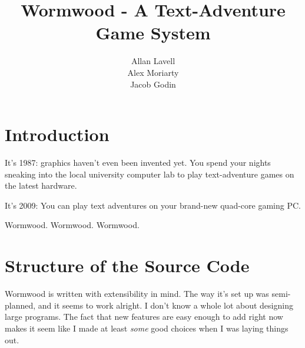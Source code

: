 \documentclass[12pt]{report}
\title{Wormwood - A Text-Adventure Game System}
\author{Allan Lavell \\ Alex Moriarty \\ Jacob Godin}
\begin{document}
\maketitle

\section{Introduction}
It's 1987: graphics haven't even been invented yet. You spend your nights sneaking into the local university computer lab to play text-adventure games on the latest hardware. 

It's 2009: You can play text adventures on your brand-new quad-core gaming PC. 

Wormwood. Wormwood. Wormwood.

\section{Structure of the Source Code}
Wormwood is written with extensibility in mind. The way it's set up was semi-planned, and it seems to work alright. I don't know a whole lot about designing large programs. The fact that new features are easy enough to add right now makes it seem like I made at least \textit{some} good choices when I was laying things out. 
\end{document}
